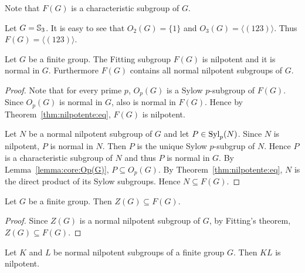 Note that $F(G)$ is a characteristic subgroup of $G$.



\begin{example}
	Let $G=\mathbb{S}_3$. It is easy to see that $O_2(G)=\{1\}$ and $O_3(G)=\langle
	(123)\rangle$. Thus $F(G)=\langle (123)\rangle$.
\end{example}

\begin{theorem}[Fitting]
	\label{theorem:Fitting}
	Let $G$ be a finite group. The Fitting subgroup $F(G)$ is nilpotent and it is normal in $G$. 
	Furthermore $F(G)$ contains all normal nilpotent subgroups of
	$G$.
\end{theorem}

\begin{proof}
	Note that for every prime $p$, $O_p(G)$ is a Sylow $p$-subgroup of $F(G)$. Since $O_p(G)$ is normal in $G$, also is normal in $F(G)$. Hence by Theorem~\ref{thm:nilpotente:eq}, $F(G)$ is
	nilpotent. 

	Let $N$ be a normal nilpotent subgroup of $G$ and let $P\in\mathrm{Syl}_p(N)$. Since
	$N$ is nilpotent, $P$ is normal in $N$. Then $P$ is the unique
	Sylow $p$-subgrup of $N$. Hence $P$ is a characteristic subgroup of $N$ and thus
	$P$ is normal in $G$. By Lemma~\ref{lemma:core:Op(G)}, $P\subseteq O_p(G)$. By Theorem~\ref{thm:nilpotente:eq}, $N$ is the direct product of its Sylow subgroups. Hence $N\subseteq F(G)$.
\end{proof}

\begin{corollary}
	\label{corollary:Z(G)subsetF(G)}
	Let $G$ be a finite group. Then $Z(G)\subseteq F(G)$.
\end{corollary}

\begin{proof}
	Since $Z(G)$ is a normal nilpotent subgroup of $G$, by Fitting's theorem,
	$Z(G)\subseteq F(G)$. 
\end{proof}

\begin{corollary}[Fitting]
	\label{corollary:Fitting}
	Let $K$ and $L$ be normal nilpotent subgroups of a finite group $G$.
	Then $KL$ is nilpotent.
\end{corollary}

